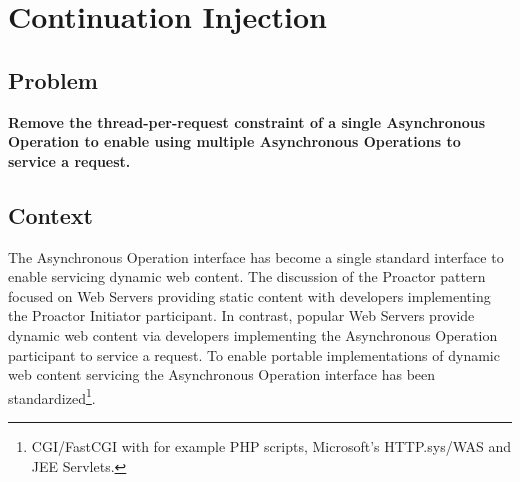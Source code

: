 \documentclass[prodmode]{style/acmlarge}
\begin{document}
\begin{table}[t]
\label{tab:example_request_operations}
\end{table}



\section{Continuation Injection}


\subsection{Problem}

\textbf{Remove the thread-per-request constraint of a single Asynchronous Operation to enable using multiple Asynchronous Operations to service a request.}


\subsection{Context}

The Asynchronous Operation interface has become a single standard interface to
enable servicing dynamic web content.  The discussion of the Proactor pattern
\cite{proactor} focused on Web Servers providing static content with developers
implementing the Proactor Initiator participant.  In contrast, popular Web
Servers provide dynamic web content via developers implementing the Asynchronous
Operation participant to service a request.  To enable portable implementations
of dynamic web content servicing the Asynchronous Operation interface has been
standardized\footnote{CGI/FastCGI with for example PHP scripts, Microsoft's
HTTP.sys/WAS and JEE Servlets.}.
\end{document}
